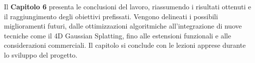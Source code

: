 \newline
\newline
Il \textbf{Capitolo 6} presenta le conclusioni del lavoro, riassumendo i risultati ottenuti e il raggiungimento degli obiettivi prefissati. Vengono delineati i possibili miglioramenti futuri, dalle ottimizzazioni algoritmiche all'integrazione di nuove tecniche come il 4D Gaussian Splatting, fino alle estensioni funzionali e alle considerazioni commerciali. Il capitolo si conclude con le lezioni apprese durante lo sviluppo del progetto.
